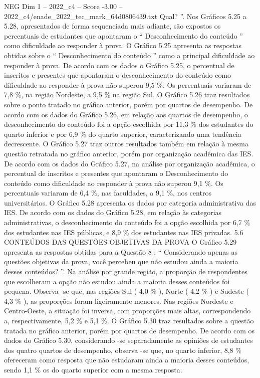 \begin{textsample}{NEG Dim 1 – 2022\_c4 – Score -3.00 – 2022\_c4/enade\_2022\_tec\_mark\_64d0806439.txt}
Qual? ”.
Nos Gráficos 5.25 a 5.28, apresentados de forma sequenciada mais adiante, são expostos os percentuais de estudantes que apontaram o “ Desconhecimento do conteúdo ” como dificuldade ao responder à prova.
O Gráfico 5.25 apresenta as respostas obtidas sobre o “ Desconhecimento do conteúdo ” como a principal dificuldade ao responder à prova.
De acordo com os dados o Gráfico 5.25, o percentual de inscritos e presentes que apontaram o desconhecimento do conteúdo como dificuldade ao responder à prova não superou 9,5 \%.
Os percentuais variaram de 7,8 \%, na região Nordeste, a 9,5 \% na região Sul.
O Gráfico 5.26 traz resultados sobre o ponto tratado no gráfico anterior, porém por quartos de desempenho.
De acordo com os dados do Gráfico 5.26, em relação aos quartos de desempenho, o desconhecimento do conteúdo foi a opção escolhida por 11,3 \% dos estudantes do quarto inferior e por 6,9 \% do quarto superior, caracterizando uma tendência decrescente.
O Gráfico 5.27 traz outros resultados também em relação à mesma questão retratada no gráfico anterior, porém por organização acadêmica das IES.
De acordo com os dados do Gráfico 5.27, na análise por organização acadêmica, o percentual de inscritos e presentes que apontaram o Desconhecimento do conteúdo como dificuldade ao responder à prova não superou 9,1 \%.
Os percentuais variaram de 6,4 \%, nas faculdades, a 9,1 \%, nos centros universitários.
O Gráfico 5.28 apresenta os dados por categoria administrativa das IES.
De acordo com os dados do Gráfico 5.28, em relação às categorias administrativas, o desconhecimento do conteúdo foi a opção escolhida por 6,7 \% dos estudantes nas IES públicas, e 8,9 \% dos estudantes nas IES privadas. 5.6 CONTEÚDOS DAS QUESTÕES OBJETIVAS DA PROVA O Gráfico 5.29 apresenta as respostas obtidas para a Questão 8 : “ Considerando apenas as questões objetivas da prova, você percebeu que não estudou ainda a maioria desses conteúdos? ”.
Na análise por grande região, a proporção de respondentes que escolheram a opção não estudou ainda a maioria desses conteúdos foi pequena.
Observa -se que, nas regiões Sul ( 4,0 \% ), Norte ( 4,2 \% ) e Sudeste ( 4,3 \% ), as proporções foram ligeiramente menores.
Nas regiões Nordeste e Centro-Oeste, a situação foi inversa, com proporções mais altas, correspondendo a, respectivamente, 5,2 \% e 5,1 \%.
O Gráfico 5.30 traz resultados sobre a questão tratada no gráfico anterior, porém por quartos de desempenho.
De acordo com os dados do Gráfico 5.30, considerando -se separadamente as opiniões de estudantes dos quatro quartos de desempenho, observa -se que, no quarto inferior, 8,8 \% ofereceram como resposta que não estudaram ainda a maioria desses conteúdos, sendo 1,1 \% os do quarto superior com a mesma resposta.

\end{textsample}
